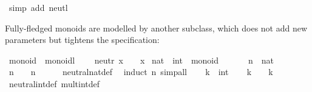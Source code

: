 \begin{isabellebody}
\ {}simp\ add{}\ neutl{}\isanewline
{}\isamarkupfalse%
\isanewline
\isanewline
{}\isamarkupfalse%
%
\endisatagquote
{\isafoldquote}%
%
\isadelimquote
%
\endisadelimquote
%
\begin{isamarkuptext}%
\noindent Fully-fledged monoids are modelled by another subclass,
  which does not add new parameters but tightens the specification:%
\end{isamarkuptext}%
\isamarkuptrue%
%
\isadelimquote
%
\endisadelimquote
%
\isatagquote
{}\isamarkupfalse%
\ monoid\ {}\ monoidl\ {}\isanewline
\ \ \ neutr{}\ {}x\ {}\ {}\ {}\ x{}\isanewline
\isanewline
{}\isamarkupfalse%
\ nat\ \ int\ {}{}\ monoid\ \isanewline
{}\isanewline
\isanewline
{}\isamarkupfalse%
\ \isamarkupfalse%
\isanewline
\ \ \isamarkupfalse%
\ n\ {}{}\ nat\isanewline
\ \ \isamarkupfalse%
\ {}n\ {}\ {}\ {}\ n{}\isanewline
\ \ \ \ \isamarkupfalse%
\ neutral{}nat{}def\ \isamarkupfalse%
\ {}induct\ n{}\ simp{}all\isanewline
{}\isamarkupfalse%
\isanewline
\ \ \isamarkupfalse%
\ k\ {}{}\ int\isanewline
\ \ \isamarkupfalse%
\ {}k\ {}\ {}\ {}\ k{}\isanewline
\ \ \ \ \isamarkupfalse%
\ neutral{}int{}def\ mult{}int{}def\ \isamarkupfalse%

\end{isabellebody}
